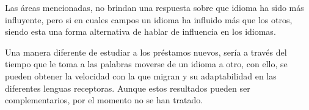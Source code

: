Las áreas mencionadas, no brindan una respuesta sobre que idioma ha sido más influyente, pero si en cuales campos un idioma ha influido más que los otros, siendo esta una forma alternativa de hablar de influencia en los idiomas.
 
Una manera diferente de estudiar a los préstamos nuevos, sería a través del tiempo que le toma a las palabras moverse de un idioma a otro, con ello, se pueden obtener la velocidad con la que migran y su adaptabilidad en las diferentes lenguas receptoras. Aunque estos resultados pueden ser complementarios, por el momento no se han tratado. 



















